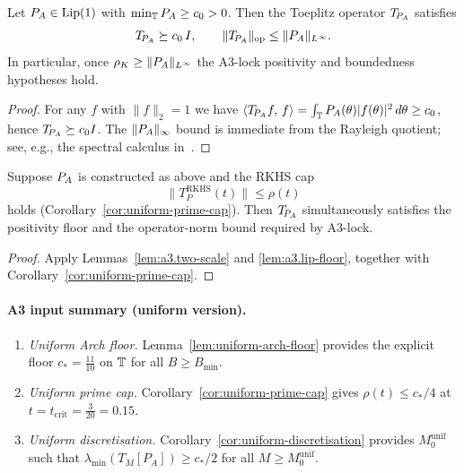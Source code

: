 \begin{lemma}\label{lem:a3.lip-floor}
Let $P_A\in\mathrm{Lip}(1)$ with $\min_{\mathbb T}P_A\ge c_0>0$.  Then the Toeplitz operator $T_{\!P_A}$ satisfies
\[
  T_{\!P_A} \succeq c_0\,I,\qquad \|T_{\!P_A}\|_{\mathrm{op}}\le \|P_A\|_{L^\infty}.
\]
In particular, once $\rho_K\ge \|P_A\|_{L^\infty}$ the A3-lock positivity and boundedness hypotheses hold.
\end{lemma}

\begin{proof}
For any $f$ with $\|f\|_2=1$ we have $\left\langle T_{\!P_A} f,\,f\right\rangle=\int_{\mathbb T}P_A(\theta)|f(\theta)|^2\,d\theta\ge c_0$, hence $T_{\!P_A}\succeq c_0 I$.  The $\|P_A\|_{\infty}$ bound is immediate from the Rayleigh quotient; see, e.g., the spectral calculus in~\cite{HornJohnson2013,Varga2004}.
\end{proof}

\begin{lemma}\label{lem:a3.cap-combine}
Suppose $P_A$ is constructed as above and the RKHS cap
\[
  \|T_P^{\mathrm{RKHS}}(t)\|\le \rho(t)
\]
holds (Corollary~\ref{cor:uniform-prime-cap}). Then $T_{\!P_A}$ simultaneously satisfies the positivity floor and the operator-norm bound required by A3-lock.
\end{lemma}

\begin{proof}
Apply Lemmas~\ref{lem:a3.two-scale} and \ref{lem:a3.lip-floor}, together with Corollary~\ref{cor:uniform-prime-cap}.
\end{proof}

\paragraph{A3 input summary (uniform version).}
\begin{enumerate}[label=(A3-U.\arabic*)]
\item \emph{Uniform Arch floor.} Lemma~\ref{lem:uniform-arch-floor} provides the explicit floor $c_*=\tfrac{11}{10}$ on $\mathbb T$ for all $B\ge B_{\min}$.
\item \emph{Uniform prime cap.} Corollary~\ref{cor:uniform-prime-cap} gives $\rho(t)\le c_*/4$ at $t=t_{\mathrm{crit}}=\tfrac{3}{20}=0.15$.
  \item \emph{Uniform discretisation.} Corollary~\ref{cor:uniform-discretisation} provides $M_0^{\mathrm{unif}}$ such that $\lambda_{\min}(T_M[P_A])\ge c_*/2$ for all $M\ge M_0^{\mathrm{unif}}$.
\end{enumerate}

